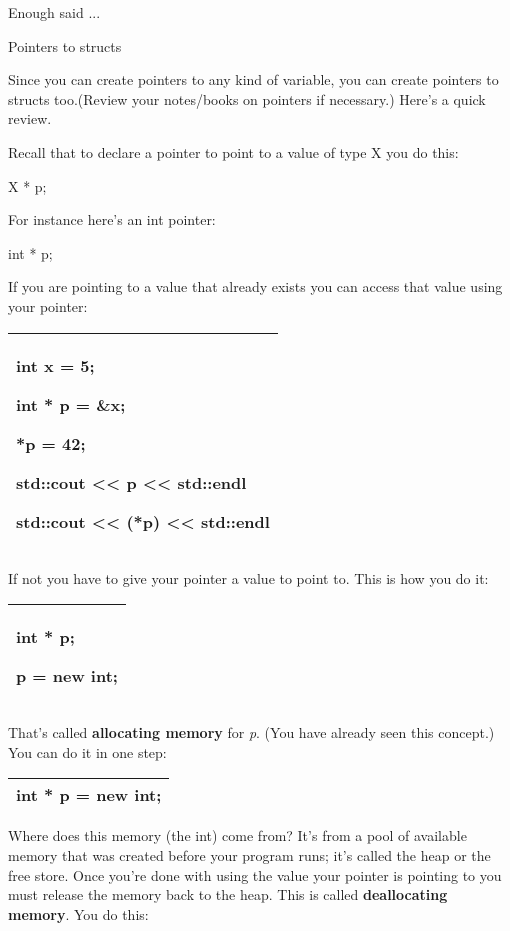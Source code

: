 \documentclass[
]{article}
\begin{document}
Enough said ...

Pointers to structs

Since you can create pointers to any kind of variable, you can create
pointers to structs too.(Review your notes/books on pointers if
necessary.) Here's a quick review.

Recall that to declare a pointer to point to a value of type X you do
this:

X * p;

For instance here's an int pointer:

int * p;

If you are pointing to a value that already exists you can access that
value using your pointer:

\begin{longtable}[]{@{}l@{}}
\toprule
\endhead
\begin{minipage}[t]{0.97\columnwidth}\raggedright
int x = 5;

int * p = \&x;

*p = 42;

std::cout \textless\textless{} p \textless\textless{} std::endl

std::cout \textless\textless{} (*p) \textless\textless{} std::endl\strut
\end{minipage}\tabularnewline
\bottomrule
\end{longtable}

If not you have to give your pointer a value to point to. This is how
you do it:

\begin{longtable}[]{@{}l@{}}
\toprule
\endhead
\begin{minipage}[t]{0.97\columnwidth}\raggedright
int * p;

p = new int;\strut
\end{minipage}\tabularnewline
\bottomrule
\end{longtable}

That's called \textbf{allocating memory} for \emph{p}. (You have already
seen this concept.) You can do it in one step:

\begin{longtable}[]{@{}l@{}}
\toprule
\endhead
int * p = new int;\tabularnewline
\bottomrule
\end{longtable}

Where does this memory (the int) come from? It's from a pool of
available memory that was created before your program runs; it's called
the heap or the free store. Once you're done with using the value your
pointer is pointing to you must release the memory back to the heap.
This is called \textbf{deallocating memory}. You do this:
\end{document}
